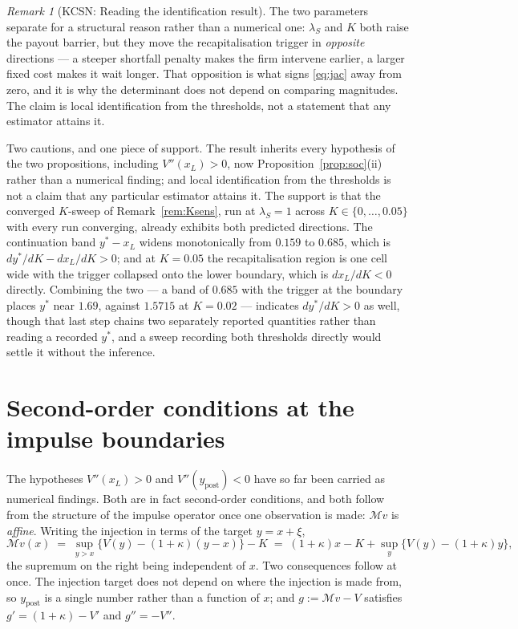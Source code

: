 \documentclass[11pt]{article}
\theoremstyle{remark}
\newtheorem{remark}{Remark}
\begin{document}
\begin{remark}[KCSN: Reading the identification result]
\label{rem:kcsn}
The two parameters separate for a structural reason rather than a
numerical one: $\lambda_S$ and $K$ both raise the payout barrier, but they
move the recapitalisation trigger in \emph{opposite} directions --- a
steeper shortfall penalty makes the firm intervene earlier, a larger fixed
cost makes it wait longer. That opposition is what signs \eqref{eq:jac}
away from zero, and it is why the determinant does not depend on comparing
magnitudes. The claim is local identification from the thresholds, not a
statement that any estimator attains it.

Two cautions, and one piece of support. The result inherits every
hypothesis of the two propositions, including $V''(x_L)>0$, now
Proposition~\ref{prop:soc}(ii) rather than a numerical finding; and local
identification from the thresholds is not a claim that any particular
estimator attains it. The support is that the converged $K$-sweep of
Remark~\ref{rem:Ksens}, run at $\lambda_S=1$ across
$K\in\{0,\dots,0.05\}$ with every run converging, already exhibits both
predicted directions. The continuation band $y^*-x_L$ widens
monotonically from $0.159$ to $0.685$, which is
$dy^*/dK - dx_L/dK > 0$; and at $K=0.05$ the recapitalisation region is
one cell wide with the trigger collapsed onto the lower boundary, which
is $dx_L/dK<0$ directly. Combining the two --- a band of $0.685$ with the
trigger at the boundary places $y^*$ near $1.69$, against $1.5715$ at
$K=0.02$ --- indicates $dy^*/dK>0$ as well, though that last step chains
two separately reported quantities rather than reading a recorded $y^*$,
and a sweep recording both thresholds directly would settle it without
the inference.
\end{remark}

\section{Second-order conditions at the impulse boundaries}
\label{sec:secondorder}

The hypotheses $V''(x_L)>0$ and $V''(y_{\mathrm{post}})<0$ have so far been
carried as numerical findings. Both are in fact second-order conditions,
and both follow from the structure of the impulse operator once one
observation is made: $\mathcal{M}v$ is \emph{affine}. Writing the injection
in terms of the target $y = x+\xi$,
\begin{equation}
\mathcal{M}v(x) \;=\; \sup_{y>x}\big\{V(y)-(1+\kappa)(y-x)\big\} - K
\;=\; (1+\kappa)x - K + \sup_{y}\big\{V(y)-(1+\kappa)y\big\},
\label{eq:Maffine}
\end{equation}
the supremum on the right being independent of $x$. Two consequences
follow at once. The injection target does not depend on where the
injection is made from, so $y_{\mathrm{post}}$ is a single number rather
than a function of $x$; and $g := \mathcal{M}v - V$ satisfies
$g' = (1+\kappa)-V'$ and $g'' = -V''$.
\end{document}
